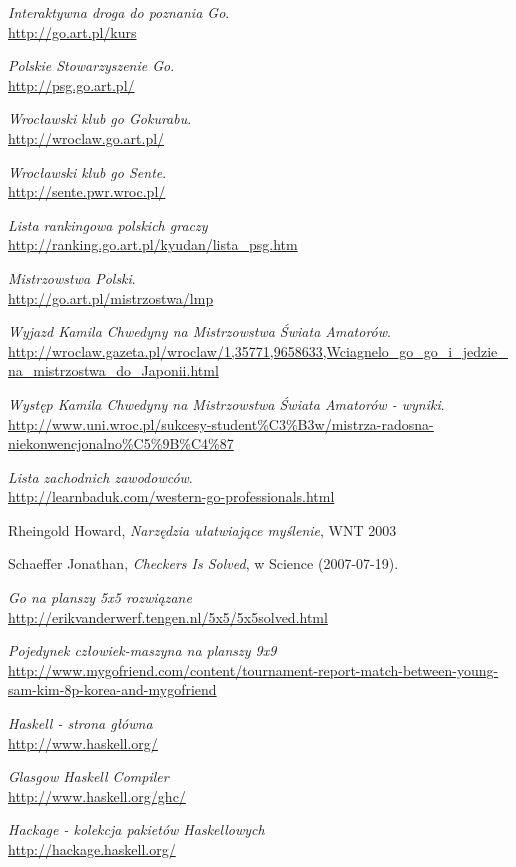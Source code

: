 \documentclass[11pt,leqno]{article}
\begin{document}
\begin{thebibliography}{9}

  \emph{Interaktywna droga do poznania Go}. \\
  \url{http://go.art.pl/kurs}

  \emph{Polskie Stowarzyszenie Go}. \\
  \url{http://psg.go.art.pl/}

  \emph{Wrocławski klub go Gokurabu}. \\
  \url{http://wroclaw.go.art.pl/}

  \emph{Wrocławski klub go Sente}. \\
  \url{http://sente.pwr.wroc.pl/}

  \emph{Lista rankingowa polskich graczy} \\
  \url{http://ranking.go.art.pl/kyudan/lista\_psg.htm}

  \emph{Mistrzowstwa Polski}. \\
  \url{http://go.art.pl/mistrzostwa/lmp}

  \emph{Wyjazd Kamila Chwedyny na Mistrzowstwa Świata Amatorów}. \\
  \url{http://wroclaw.gazeta.pl/wroclaw/1,35771,9658633,Wciagnelo_go_go_i_jedzie_na_mistrzostwa_do_Japonii.html}

  \emph{Występ Kamila Chwedyny na Mistrzowstwa Świata Amatorów - wyniki}. \\
  \url{http://www.uni.wroc.pl/sukcesy-student%C3%B3w/mistrza-radosna-niekonwencjonalno%C5%9B%C4%87}

  \emph{Lista zachodnich zawodowców}. \\
  \url{http://learnbaduk.com/western-go-professionals.html}

  Rheingold Howard, \emph{Narzędzia ułatwiające myślenie}, WNT 2003

  Schaeffer Jonathan, \emph{Checkers Is Solved}, w Science (2007-07-19). 

  \emph{Go na planszy 5x5 rozwiązane} \\
  \url{http://erikvanderwerf.tengen.nl/5x5/5x5solved.html}

  \emph{Pojedynek człowiek-maszyna na planszy 9x9}
  \url{http://www.mygofriend.com/content/tournament-report-match-between-young-sam-kim-8p-korea-and-mygofriend}

  \emph{Haskell - strona główna} \\
  \url{http://www.haskell.org/}

  \emph{Glasgow Haskell Compiler} \\
  \url{http://www.haskell.org/ghc/}

  \emph{Hackage - kolekcja pakietów Haskellowych} \\
  \url{http://hackage.haskell.org/}

\end{thebibliography}
\end{document}
